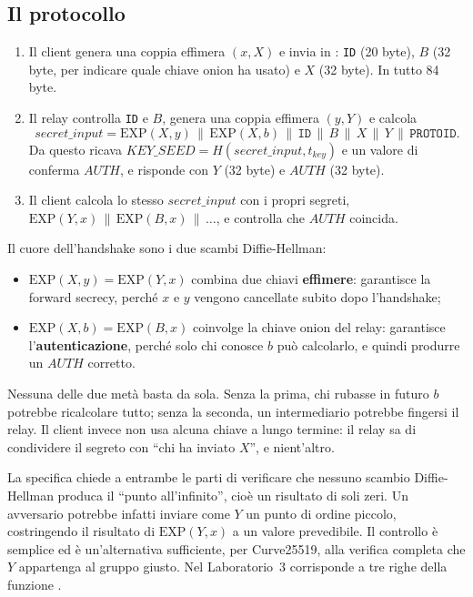 \subsection{Il protocollo}

\begin{enumerate}
  \item Il client genera una coppia effimera $(x, X)$ e invia in : \texttt{ID} (20 byte), $B$ (32 byte, per indicare quale chiave onion ha usato) e $X$ (32 byte). In tutto 84 byte.
  \item Il relay controlla \texttt{ID} e $B$, genera una coppia effimera $(y, Y)$ e calcola
  \[ \mathit{secret\_input} = \mathrm{EXP}(X, y) \,\|\, \mathrm{EXP}(X, b) \,\|\, \texttt{ID} \,\|\, B \,\|\, X \,\|\, Y \,\|\, \texttt{PROTOID}. \]
  Da questo ricava $\mathit{KEY\_SEED} = H(\mathit{secret\_input}, t_{\mathit{key}})$ e un valore di conferma $\mathit{AUTH}$, e risponde con $Y$ (32 byte) e $\mathit{AUTH}$ (32 byte).
  \item Il client calcola lo stesso $\mathit{secret\_input}$ con i propri segreti, $\mathrm{EXP}(Y, x) \,\|\,\allowbreak \mathrm{EXP}(B, x) \,\|\, \ldots$, e controlla che $\mathit{AUTH}$ coincida.
\end{enumerate}

Il cuore dell'handshake sono i due scambi Diffie-Hellman:
\begin{itemize}
  \item $\mathrm{EXP}(X, y) = \mathrm{EXP}(Y, x)$ combina due chiavi \textbf{effimere}: garantisce la forward secrecy, perché $x$ e $y$ vengono cancellate subito dopo l'handshake;
  \item $\mathrm{EXP}(X, b) = \mathrm{EXP}(B, x)$ coinvolge la chiave onion del relay: garantisce l'\textbf{autenticazione}, perché solo chi conosce $b$ può calcolarlo, e quindi produrre un $\mathit{AUTH}$ corretto.
\end{itemize}
Nessuna delle due metà basta da sola. Senza la prima, chi rubasse in futuro $b$ potrebbe ricalcolare tutto; senza la seconda, un intermediario potrebbe fingersi il relay. Il client invece non usa alcuna chiave a lungo termine: il relay sa di condividere il segreto con \enquote{chi ha inviato $X$}, e nient'altro.

\begin{approfondimento}
La specifica chiede a entrambe le parti di verificare che nessuno scambio Diffie-Hellman produca il \enquote{punto all'infinito}, cioè un risultato di soli zeri. Un avversario potrebbe infatti inviare come $Y$ un punto di ordine piccolo, costringendo il risultato di $\mathrm{EXP}(Y, x)$ a un valore prevedibile. Il controllo è semplice ed è un'alternativa sufficiente, per Curve25519, alla verifica completa che $Y$ appartenga al gruppo giusto. Nel Laboratorio~3 corrisponde a tre righe della funzione .
\end{approfondimento}

